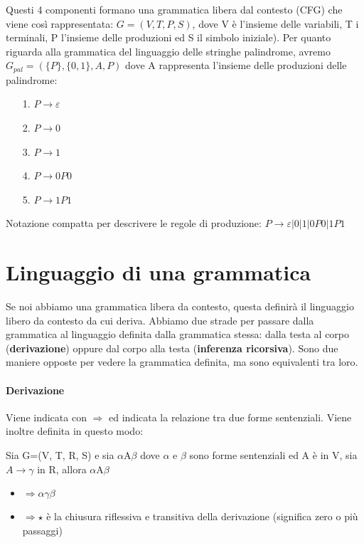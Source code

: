 Questi 4 componenti formano una grammatica libera dal contesto (CFG) che viene così
rappresentata: $G=(V,T,P,S)$, dove V è l'insieme delle variabili, T i terminali, 
P l'insieme delle produzioni ed S il simbolo iniziale).
Per quanto riguarda alla grammatica del linguaggio delle stringhe palindrome, avremo
$G_{pal}=(\{P\}, \{0,1\}, A, P)$ dove A rappresenta l'insieme delle produzioni delle
palindrome:
\begin{itemize}
\item[1.] $P \rightarrow \varepsilon$
\item[2.] $P \rightarrow 0$
\item[3.] $P \rightarrow 1$
\item[4.] $P \rightarrow 0P0$
\item[5.] $P \rightarrow 1P1$
\end{itemize}
Notazione compatta per descrivere le regole di produzione: $P \rightarrow \varepsilon
 | 0 | 1 | 0P0 | 1P1$

\section{Linguaggio di una grammatica}
Se noi abbiamo una grammatica libera da contesto, questa definirà il linguaggio 
libero da contesto da cui deriva. Abbiamo due strade per passare dalla grammatica al 
linguaggio definita dalla grammatica stessa: dalla testa al corpo 
(\textbf{derivazione}) oppure dal corpo alla testa (\textbf{inferenza ricorsiva}). 
Sono due maniere opposte per vedere la grammatica definita, ma sono equivalenti tra 
loro.

\paragraph{Derivazione}
Viene indicata con $\Rightarrow$ ed indicata la relazione tra due forme sentenziali.
Viene inoltre definita in questo modo:
\begin{defn}[Derivazione]
Sia G=(V, T, R, S) e sia $\alpha$A$\beta$ dove $\alpha$ e $\beta$ sono forme
sentenziali ed A è in V, sia $A\rightarrow\gamma$ in R, allora $\alpha$A$\beta$
\begin{itemize}
\item $\Rightarrow \alpha\gamma\beta$
\item $\Rightarrow\star$ è la chiusura riflessiva e transitiva della derivazione 
(significa zero o più passaggi)
\end{itemize}
\end{defn}

